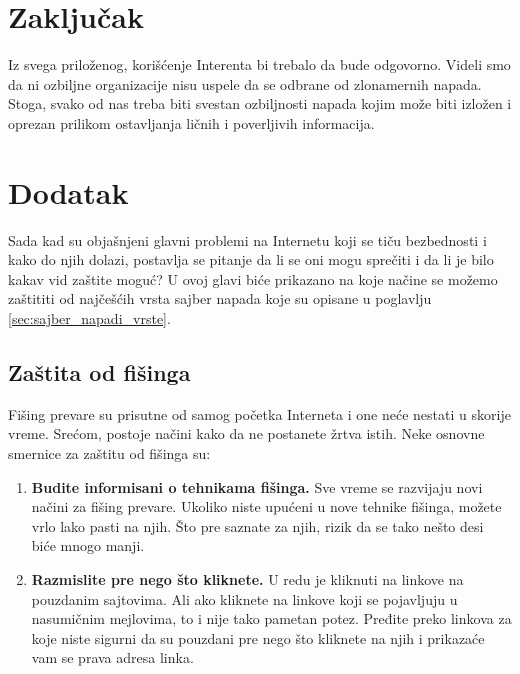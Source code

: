 \documentclass[a4paper]{article}
\theoremstyle{break}
\begin{document}
{\section{Zaključak}
\label{sec:zakljucak}

Iz svega priloženog, korišćenje Interenta bi trebalo da bude odgovorno. Videli smo da ni ozbiljne organizacije nisu uspele da se odbrane od zlonamernih napada. Stoga, svako od nas treba biti svestan ozbiljnosti napada kojim može biti izložen i oprezan prilikom ostavljanja ličnih i poverljivih informacija.
 

\appendix
\raggedright
 



\appendix
\section{Dodatak}
\label{sec:dodatak}
Sada kad su objašnjeni glavni problemi na Internetu koji se tiču bezbednosti i kako do njih dolazi, postavlja se pitanje da li se oni mogu sprečiti i da li je bilo kakav vid zaštite moguć?
U ovoj glavi biće prikazano na koje načine se možemo zaštititi od najčešćih vrsta sajber napada koje su opisane u poglavlju \ref{sec:sajber_napadi_vrste}.

\subsection{Zaštita od fišinga}
\label{subsec:zastita_od_fisinga}
Fišing prevare su prisutne od samog početka Interneta i one neće nestati u skorije vreme. Srećom, postoje načini kako da ne postanete žrtva istih. Neke osnovne smernice za zaštitu od fišinga \cite{phishing_protect} su:

\begin{enumerate}
\item \textbf{Budite informisani o tehnikama fišinga.} Sve vreme se razvijaju novi načini za fišing prevare. Ukoliko niste upućeni u nove tehnike fišinga, možete vrlo lako pasti na njih. Što pre saznate za njih, rizik da se tako nešto desi biće mnogo manji.

\item \textbf{Razmislite pre nego što kliknete.} U redu je kliknuti na linkove na pouzdanim sajtovima. Ali ako kliknete na linkove koji se pojavljuju u nasumičnim mejlovima, to i nije tako pametan potez. Pređite preko linkova za koje niste sigurni da su pouzdani pre nego što kliknete na njih i prikazaće vam se prava adresa linka.


\end{enumerate}}
\end{document}
